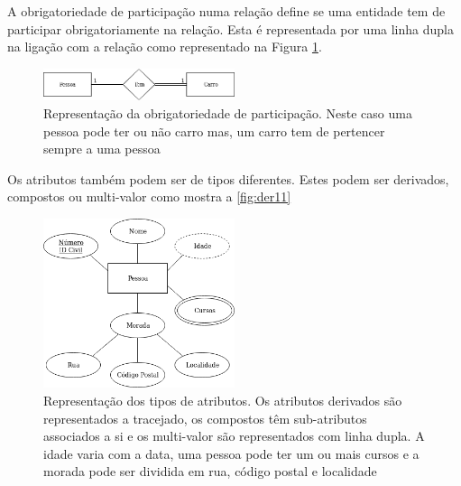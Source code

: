 \documentclass[11pt,twoside,a4paper]{report}
\begin{document}
A obrigatoriedade de participação numa relação define se uma entidade tem de participar obrigatoriamente na relação. Esta é representada por uma linha dupla na ligação com a relação como representado na Figura \ref{fig:der9}. 
\begin{figure}[H]
	\begin{center}
		\includegraphics[width=0.5\textwidth]{notacao13} %
		\caption[Representação da obrigatoriedade de participação]{Representação da obrigatoriedade de participação. Neste caso uma pessoa pode ter ou não carro mas, um carro tem de pertencer sempre a uma pessoa}
		\label{fig:der9}
	\end{center}
\end{figure}
Os atributos também podem ser de tipos diferentes. Estes podem ser derivados, compostos ou multi-valor como mostra a \autoref{fig:der11}
\begin{figure}[H]
	\begin{center}
		\includegraphics[width=0.5\textwidth]{notacao14} %
		\caption[Representação dos tipos de atributos]{Representação dos tipos de atributos. Os atributos derivados são representados a tracejado, os compostos têm sub-atributos associados a si e os multi-valor são representados com linha dupla. A idade varia com a data, uma pessoa pode ter um ou mais cursos e a morada pode ser dividida em rua, código postal e localidade}
		\label{fig:der11}
	\end{center}
\end{figure}
\end{document}
